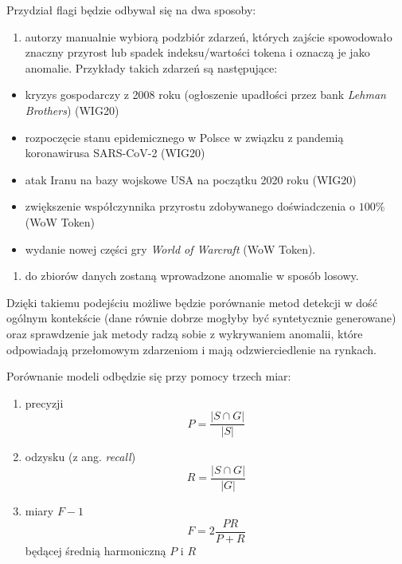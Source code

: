 \documentclass{article}
\begin{document}
Przydział flagi będzie odbywał się na dwa sposoby:

\begin{enumerate}
\def\labelenumi{\arabic{enumi}.}
\item
  autorzy manualnie wybiorą podzbiór zdarzeń, których zajście
  spowodowało znaczny przyrost lub spadek indeksu/wartości tokena i
  oznaczą je jako anomalie. Przykłady takich zdarzeń są następujące:
\end{enumerate}

\begin{itemize}
  \item kryzys gospodarczy z 2008 roku (ogłoszenie upadłości przez bank \emph{Lehman Brothers}) (WIG20)
\item rozpoczęcie stanu epidemicznego w Polsce w związku z pandemią koronawirusa SARS-CoV-2 (WIG20)
\item atak Iranu na bazy wojskowe USA na początku 2020 roku (WIG20)
\item zwiększenie współczynnika przyrostu zdobywanego doświadczenia o $100 \%$ (WoW Token)
\item wydanie nowej części gry \emph{World of Warcraft} (WoW Token).
\end{itemize}

\begin{enumerate}
\def\labelenumi{\arabic{enumi}.}
\setcounter{enumi}{1}
\item
  do zbiorów danych zostaną wprowadzone anomalie w sposób losowy.
\end{enumerate}

Dzięki takiemu podejściu możliwe będzie porównanie metod detekcji w dość
ogólnym kontekście (dane równie dobrze mogłyby być syntetycznie
generowane) oraz sprawdzenie jak metody radzą sobie z wykrywaniem
anomalii, które odpowiadają przełomowym zdarzeniom i mają
odzwierciedlenie na rynkach.

Porównanie modeli odbędzie się przy pomocy trzech miar:

\begin{enumerate}
\def\labelenumi{\arabic{enumi}.}
\item
  precyzji 
    \begin{equation*}
       P = \frac{|S \cap G|}{|S|}
    \end{equation*}
\item
  odzysku (z ang. \emph{recall}) 
    \begin{equation*}
      R = \frac{|S \cap G|}{|G|}
    \end{equation*}

\item
  miary $F-1$
    \begin{equation*}
    F = 2\frac{PR}{P + R}
    \end{equation*}
  będącej średnią harmoniczną \(P\) i \(R\)
\end{enumerate}
\end{document}
